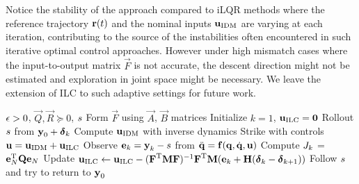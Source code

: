 
Notice the stability of the approach compared to iLQR methods where the reference trajectory $\boldsymbol{\mathrm{r}}(t)$ and the nominal inputs $\boldsymbol{\mathrm{u}}_{\mathrm{IDM}}$ are varying at each iteration, contributing to the source of the instabilities often encountered in such iterative optimal control approaches. However under high mismatch cases where the input-to-output matrix $\vec{F}$ is not accurate, the descent direction might not be estimated and exploration in joint space might be necessary. We leave the extension of ILC to such adaptive settings for future work.

\begin{algorithm}[tb]
   \caption{\alg}
   \label{alg1}
\begin{algorithmic}
    $\epsilon > 0$, $\vec{Q}, \vec{R} \succeq 0$, $s$ 
   \STATE Form $\vec{F}$ using $\vec{A}$, $\vec{B}$ matrices
   \STATE Initialize $k = 1$, $\boldsymbol{\mathrm{u}}_{\mathrm{ILC}} = \boldsymbol{\mathrm{0}}$
   \REPEAT 
   	   \STATE Rollout $s$ from $\boldsymbol{\mathrm{y}}_0 + \boldsymbol{\mathrm{\delta}}_k$ 
   	   \STATE Compute $\boldsymbol{\mathrm{u}}_{\mathrm{IDM}}$ with inverse dynamics
 	   \STATE Strike with controls $\boldsymbol{\mathrm{u}} = \boldsymbol{\mathrm{u}}_{\mathrm{IDM}} + \boldsymbol{\mathrm{u}}_{\mathrm{ILC}}$  %
 	   \STATE Observe $\boldsymbol{\mathrm{e}}_k = \boldsymbol{\mathrm{y}}_k - s$ from $\ddot{\boldsymbol{\mathrm{q}}} = \boldsymbol{\mathrm{f}}(\boldsymbol{\mathrm{q}},\dot{\boldsymbol{\mathrm{q}}},\boldsymbol{\mathrm{u}})$
 	   \STATE Compute $J_k$ = $\boldsymbol{\mathrm{e}}_N^{\mathrm{T}}\boldsymbol{\mathrm{Q}}\boldsymbol{\mathrm{e}}_N$
 	   \STATE Update $\boldsymbol{\mathrm{u}}_{\mathrm{ILC}} \leftarrow \boldsymbol{\mathrm{u}}_{\mathrm{ILC}} - (\boldsymbol{\mathrm{F}}^{\mathrm{T}}\boldsymbol{\mathrm{M}}\boldsymbol{\mathrm{F}})^{-1}\boldsymbol{\mathrm{F}}^{\mathrm{T}}\boldsymbol{\mathrm{M}}(\boldsymbol{\mathrm{e}}_k + \boldsymbol{\mathrm{H}}(\boldsymbol{\mathrm{\delta}}_k - \boldsymbol{\mathrm{\delta}}_{k+1}))$
 	   \STATE Follow $s$ and try to return to $\boldsymbol{\mathrm{y}}_0$
\end{algorithmic}
\end{algorithm}